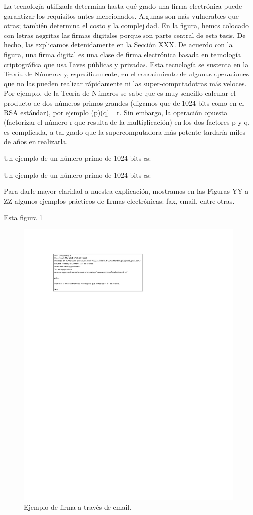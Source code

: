 \documentclass[12pt]{report} %
\begin{document}
\begin{itemize}
La tecnología utilizada determina hasta qué grado una firma electrónica puede garantizar los requisitos antes mencionados. Algunas son más vulnerables que otras; también determina el costo y la complejidad. En la figura, hemos colocado con letras negritas las firmas digitales porque son parte central de esta tesis. De hecho, las explicamos detenidamente en la Sección XXX. De acuerdo con la figura, una firma digital es una clase de firma electrónica basada en tecnología criptográfica que usa llaves públicas y privadas. Esta tecnología se sustenta en la Teoría de Números y, específicamente, en el conocimiento de algunas operaciones que no las pueden realizar rápidamente ni las super-computadotras más veloces. Por ejemplo, de la Teoría de Números se sabe que es muy sencillo calcular el producto de dos números primos grandes (digamos que de 1024 bits como en el RSA estándar), por ejemplo (p)(q)= r.  Sin embargo, la operación opuesta (factorizar el número r que resulta de la multiplicación) en los dos factores p y q, es complicada, a tal grado que la supercomputadora más potente tardaría miles de años en realizarla.

Un ejemplo de un número primo de 1024 bits es:

Un ejemplo de un número primo de 1024 bits es:

Para darle mayor claridad a nuestra explicación, mostramos en las Figuras YY a ZZ algunos ejemplos prácticos de firmas electrónicas: fax, email, entre otras. 

Esta figura \ref{Fig. Firmaemail}


\begin{figure}
\centering
\includegraphics[width=0.85\columnwidth]{imagenes/firmaemail.pdf}
\caption{Ejemplo de firma a través de email.}
\label{Fig. Firmaemail}
\end{figure} 



\end{itemize}
\end{document}
